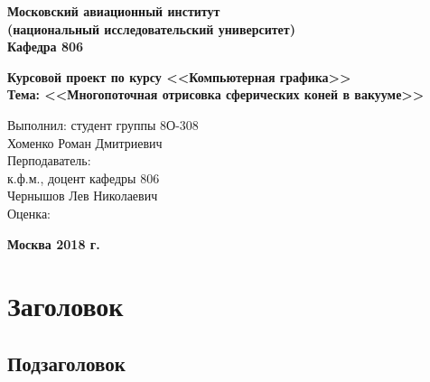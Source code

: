 \documentclass[a4paper]{article}
\newcommand{\fontFourteen} {
    \fontsize{14pt}{17pt}\normalfont
}
\begin{document}
\fontFourteen


\begin{titlepage}
\begin{spacing}{1}

\fontFourteen

\begin{center}
{\bfseries{
    {Московский авиационный институт} \\
    {(национальный исследовательский университет)} \\
    {Кафедра 806}
}}

\vspace{8cm}
{\bfseries{
    {Курсовой проект по курсу <<Компьютерная графика>> } \\
    {Тема: <<Многопоточная отрисовка сферических коней в вакууме>>}
}}
\end{center}

\vspace{5cm}
\begin{flushright}
\begin{minipage}{0.5\textwidth}
    \begin{flushleft}
        {Выполнил: студент группы 8О-308} \\
        {Хоменко Роман Дмитриевич} \\
        \vspace{0.5cm}
        {Перподаватель:} \\
        {к.ф.м., доцент кафедры 806} \\
        {Чернышов Лев Николаевич} \\
        \vspace{0.5cm}
        Оценка:
    \end{flushleft}
\end{minipage}
\end{flushright}

\vfill
\begin{center}
\bfseries{
    {Москва 2018 г.}
}
\end{center}

\end{spacing}
\end{titlepage}


\section{Заголовок}
\subsection{Подзаголовок}
\end{document}
